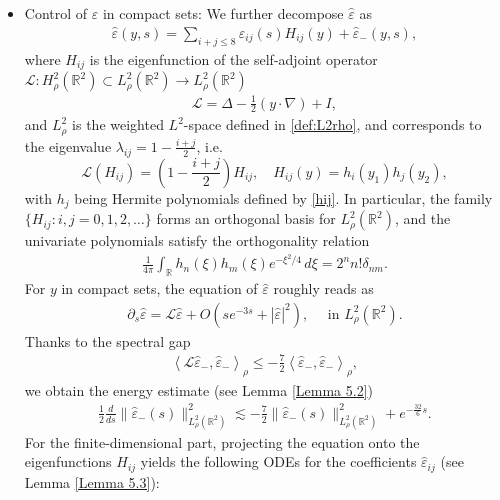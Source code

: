 \documentclass[11pt,reqno]{amsart}
\theoremstyle{definition}
\theoremstyle{bfremark}
\numberwithin{equation}{section}
\newcommand{\veph}{\hat\varepsilon }
\begin{document}
\begin{itemize}
    \item Control of \(\varepsilon\) in compact sets:
We further decompose \(\veph\) as
\begin{align*}
    \veph(y,s)=\sum_{i+j \leq 8}\veph_{ij}(s)H_{ij}(y)+\veph_-(y,s),
\end{align*}
where $H_{ij}$ is the eigenfunction of the self-adjoint operator $\mathcal{L}: H^2_\rho(\mathbb{R}^2) \subset L^2_{\rho}(\mathbb{R}^2) \to L^2_{\rho}(\mathbb{R}^2)$
\begin{align}
    \mathcal{L}=\Delta-\frac{1}{2}(y \cdot \nabla)+I\label{def:L},
\end{align}
and $L^2_\rho$ is the weighted $L^2$-space defined in \eqref{def:L2rho}, and corresponds to the eigenvalue $\lambda_{ij} = 1 - \frac{i+j}{2}$, i.e. 
\begin{equation}
    \mathcal{L}(H_{ij}) = \left(1 - \frac{i + j}{2}\right) H_{ij}, \quad H_{ij}(y) = h_i(y_1) h_j(y_2), \label{Hij}
\end{equation}
with $h_j$ being Hermite polynomials defined by \ref{hij}. In particular, the family \(\{H_{ij} : i, j = 0, 1, 2, \dots\}\) forms an orthogonal basis for \(L^2_{\rho}(\mathbb{R}^2)\), and the univariate polynomials satisfy the orthogonality relation
\begin{align}
    \frac{1}{4\pi}\int_{\mathbb{R}} h_n(\xi) h_m(\xi) e^{-\xi^2/4} \, d\xi = 2^n n! \delta_{nm}.\label{otho}
\end{align}
For \(y\) in compact sets,  the equation of $\veph$ roughly reads as 
\begin{align*}
  \partial_s\veph=\mathcal{L}\veph+O(se^{-3s} + |\veph|^2), \quad \text{ in }  L^2_{\rho}(\mathbb{R}^2).
\end{align*}
Thanks to the spectral gap
\begin{align*}
    \left<\mathcal{L}\veph_-,\veph_-\right>_{\rho} \leq -\frac{7}{2}\left<\veph_-,\veph_-\right>_{\rho},
\end{align*}
we obtain the energy estimate (see Lemma \ref{Lemma 5.2})
\begin{align}
        \frac{1}{2}\frac{d}{ds}\|\veph_-(s)\|^2_{L^2_{\rho}(\mathbb{R}^2)} \lesssim -\frac{7}{2}\|\veph_-(s)\|^2_{L^2_{\rho}(\mathbb{R}^2)}+e^{-\frac{32}{6}s}.\label{introen1}
\end{align}
For the finite-dimensional part, projecting the equation onto the eigenfunctions \(H_{ij}\) yields the following ODEs for the coefficients 
 \(\veph_{ij}\) (see Lemma \ref{Lemma 5.3}):
\begin{align*}

\end{align*}
\end{itemize}
\end{document}
